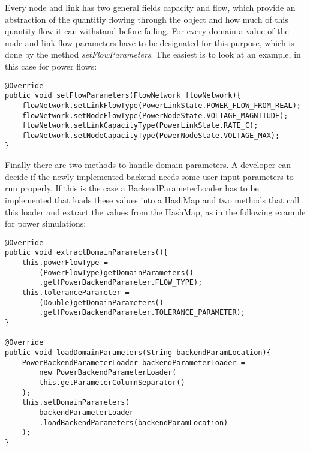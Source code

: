 \documentclass[11pt,fleqn]{book} %
\newcommand{\backend}[1][]{backend#1}
\newcommand{\domain}[1][]{domain#1}
\newcommand{\backendparameters}{domain parameters}
\newcommand{\BackendParameterLoader}{BackendParameterLoader}
\begin{document}
Every node and link has two general fields capacity and flow, which provide an abstraction of the quantitiy flowing through the object and how much of this quantity flow it can withstand before failing. For every \domain{} a value of the node and link flow parameters have to be designated for this purpose, which is done by the method \textit{setFlowParameters}. The easiest is to look at an example, in this case for power flows:
\begin{lstlisting}[frame=single]
@Override
public void setFlowParameters(FlowNetwork flowNetwork){
    flowNetwork.setLinkFlowType(PowerLinkState.POWER_FLOW_FROM_REAL);
    flowNetwork.setNodeFlowType(PowerNodeState.VOLTAGE_MAGNITUDE);
    flowNetwork.setLinkCapacityType(PowerLinkState.RATE_C);
    flowNetwork.setNodeCapacityType(PowerNodeState.VOLTAGE_MAX);
}
\end{lstlisting}

Finally there are two methods to handle \backendparameters{}. A developer can decide if the newly implemented \backend{} needs some user input parameters to run properly. If this is the case a \BackendParameterLoader{} has to be implemented that loads these values into a HashMap and two methods that call this loader and extract the values from the HashMap, as in the following example for power simulations:
\begin{lstlisting}[frame=single]
@Override
public void extractDomainParameters(){
    this.powerFlowType = 
        (PowerFlowType)getDomainParameters()
        .get(PowerBackendParameter.FLOW_TYPE);
    this.toleranceParameter = 
        (Double)getDomainParameters()
        .get(PowerBackendParameter.TOLERANCE_PARAMETER);
}

@Override
public void loadDomainParameters(String backendParamLocation){
    PowerBackendParameterLoader backendParameterLoader = 
        new PowerBackendParameterLoader(
        this.getParameterColumnSeparator()
    );
    this.setDomainParameters(
        backendParameterLoader
        .loadBackendParameters(backendParamLocation)
    );
}
\end{lstlisting}
\end{document}
